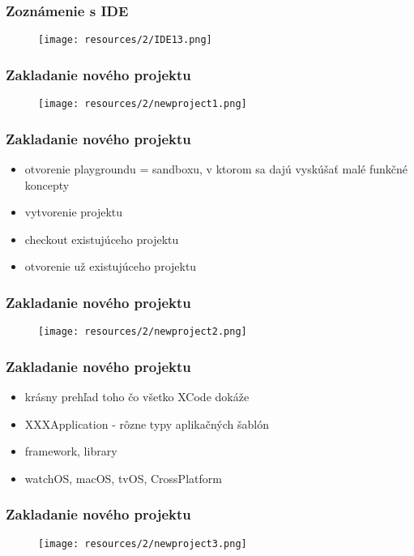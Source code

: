 \documentclass[serif,mathserif]{beamer}
\begin{document}
\begin{frame}
  \frametitle{Zoznámenie s IDE}
 \begin{figure}[h]
	\texttt{[image: resources/2/IDE13.png]}
  \end{figure}
\end{frame}


\begin{frame}
  \frametitle{Zakladanie nového projektu}
 \begin{figure}[h]
	\texttt{[image: resources/2/newproject1.png]}
  \end{figure}
\end{frame}

\begin{frame}
  \frametitle{Zakladanie nového projektu}
  \begin{itemize}
  \item otvorenie playgroundu = sandboxu, v ktorom sa dajú vyskúšať malé funkčné koncepty\pause
  \item vytvorenie projektu\pause
  \item checkout existujúceho projektu\pause
  \item otvorenie už existujúceho projektu
  \end{itemize}
\end{frame}

\begin{frame}
  \frametitle{Zakladanie nového projektu}
 \begin{figure}[h]
	\texttt{[image: resources/2/newproject2.png]}
  \end{figure}
\end{frame}

\begin{frame}
  \frametitle{Zakladanie nového projektu}
  \begin{itemize}
  \item krásny prehľad toho čo všetko XCode dokáže\pause
  \item XXXApplication - rôzne typy aplikačných šablón\pause
  \item framework, library\pause
  \item watchOS, macOS, tvOS, CrossPlatform
  \end{itemize}
\end{frame}

\begin{frame}
  \frametitle{Zakladanie nového projektu}
 \begin{figure}[h]
	\texttt{[image: resources/2/newproject3.png]}
  \end{figure}
\end{frame}
\end{document}
